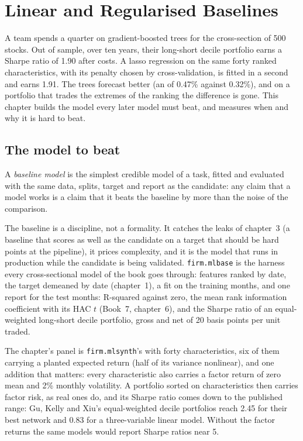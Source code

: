 \chapter{Linear and Regularised Baselines}\label{ch:ml:linear-and-regularised-baselines}

A team spends a quarter on gradient-boosted trees for the cross-section of 500 stocks. Out of sample, over ten years,
their long-short decile portfolio earns a Sharpe ratio of 1.90 after costs. A lasso regression on the same forty ranked
characteristics, with its penalty chosen by cross-validation, is fitted in a second and earns 1.91. The trees forecast
better (an  of 0.47\% against 0.32\%), and on a portfolio that trades the extremes of the
ranking the difference is gone. This chapter builds the model every later model must beat, and measures when and
why it is hard to beat.

\section{The model to beat}

\begin{definition}\label{def:ml:linear-and-regularised-baselines:baseline}
A \emph{baseline model} is the simplest credible model of a task, fitted and evaluated with the
same data, splits, target and report as the candidate: any claim that a model works is a claim that it beats the
baseline by more than the noise of the comparison.
\end{definition}

The baseline is a discipline, not a formality. It catches the leaks of chapter~3 (a baseline that scores as well as the
candidate on a target that should be hard points at the pipeline), it prices complexity, and it is the model that runs
in production while the candidate is being validated. \texttt{firm.mlbase} is the harness every cross-sectional model of
the book goes through: features ranked by date, the target demeaned by date (chapter~1), a fit on the training months,
and one report for the test months: R-squared against zero, the mean rank information coefficient with its HAC $t$
(Book~7, chapter~6), and the Sharpe ratio of an equal-weighted long-short decile portfolio, gross and net of 20 basis
points per unit traded.

The chapter's panel is \texttt{firm.mlsynth}'s with forty characteristics, six of them carrying a planted expected return
(half of its variance nonlinear), and one addition that matters: every characteristic also carries a factor return of
zero mean and 2\% monthly volatility. A portfolio sorted on characteristics then carries factor risk, as real ones do,
and its Sharpe ratio comes down to the published range: Gu, Kelly and Xiu's equal-weighted decile portfolios reach 2.45
for their best network and 0.83 for a three-variable linear model. Without the factor returns the same models would
report Sharpe ratios near 5.

